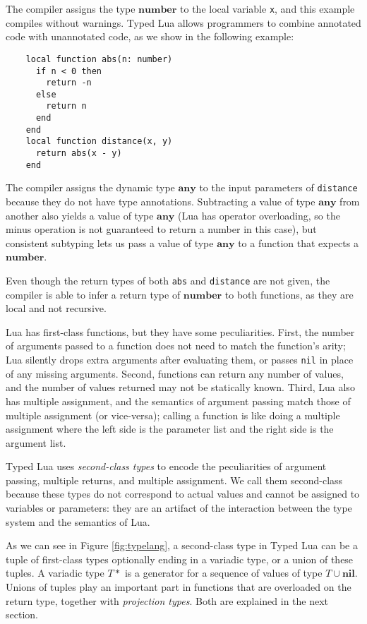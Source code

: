 \documentclass{sig-alternate}
\newcommand{\Any}{\mathbf{any}}
\newcommand{\Nil}{\mathbf{nil}}
\newcommand{\Number}{\mathbf{number}}
\begin{document}
The compiler assigns the type $\Number$ to the local variable \texttt{x},
and this example compiles without warnings. Typed Lua allows
programmers to combine annotated code with
unannotated code, as we show in the following example:
\begin{verbatim}
    local function abs(n: number)
      if n < 0 then
        return -n
      else
        return n
      end
    end
    local function distance(x, y)
      return abs(x - y)
    end
\end{verbatim}

The compiler assigns the dynamic type $\Any$ to the input
parameters of \texttt{distance} because they do not have type annotations.
Subtracting a value of type $\Any$ from another also yields a value of
type $\Any$ (Lua has operator overloading, so the minus operation
is not guaranteed to return a number in this case), but
consistent subtyping lets us pass a value of type $\Any$ to a
function that expects a $\Number$. 

Even though the return types
of both {\tt abs} and {\tt distance} are not given, the compiler is able to
infer a return type of $\Number$ to both functions, as they are
local and not recursive.

Lua has first-class functions, but they have some peculiarities. First,
the number of arguments passed to a function does not need to
match the function's arity; Lua silently drops extra arguments after
evaluating them, or passes {\tt nil} in place of any missing arguments.
Second, functions can return any number of values, and the number
of values returned may not be statically known. Third, Lua also has
multiple assignment, and the semantics of argument passing match
those of multiple assignment (or vice-versa); calling a function is like
doing a multiple assignment where the left side is the parameter list
and the right side is the argument list. 

Typed Lua uses {\em second-class types} to encode the peculiarities
of argument passing, multiple returns, and multiple assignment. We call
them second-class because these types do not correspond to actual
values and cannot be assigned to variables or parameters: they are an
artifact of the interaction between the type system and the semantics of Lua.

As we can see in Figure \ref{fig:typelang}, a second-class
type in Typed Lua can be a tuple of first-class types
optionally ending in a variadic type, or a union of these
tuples. A variadic type $T*$ is a generator for a
sequence of values of type $T \cup \Nil$. Unions of tuples play
an important part in functions that are overloaded on the
return type, together with {\em projection types}. Both are
explained in the next
section.
\end{document}
